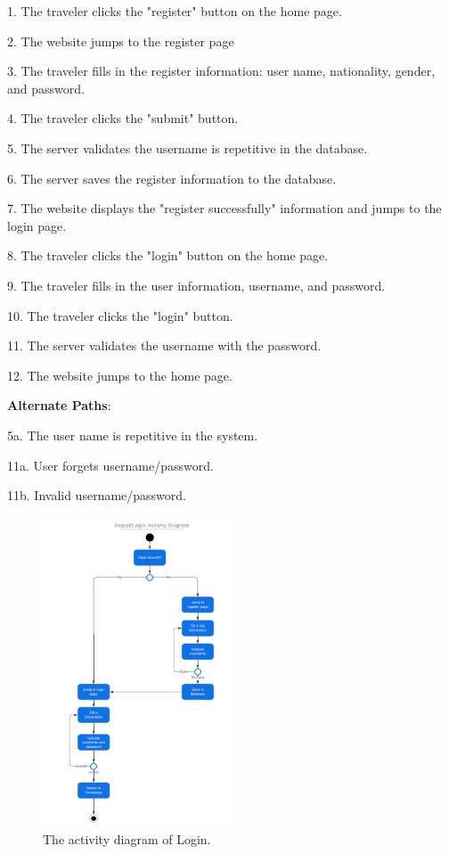 \documentclass[conference]{IEEEtran}
\begin{document}
1. The traveler clicks the "register" button on the home page.

2. The website jumps to the register page

3. The traveler fills in the register information: user name, nationality, gender, and password. 

4. The traveler clicks the "submit" button.

5. The server validates the username is repetitive in the database.

6. The server saves the register information to the database.

7. The website displays the "register successfully" information and jumps to the login page.

8. The traveler clicks the "login" button on the home page.

9. The traveler fills in the user information, username, and password. 

10. The traveler clicks the "login" button.

11. The server validates the username with the password.

12. The website jumps to the home page.


\textbf{Alternate Paths}:

5a. The user name is repetitive in the system.

11a. User forgets username/password.

11b. Invalid username/password.


\begin{figure}[htbp]
\centerline{\includegraphics[width=0.5\textwidth]{activity_diagram_login.pdf}}
\caption{The activity diagram of Login.}
\label{fig3}
\end{figure}
\end{document}
